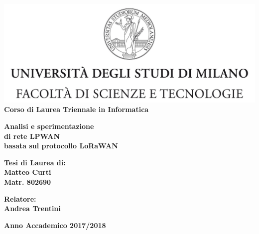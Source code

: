 \documentclass[a4paper]{report} %
\begin{document}
\hypersetup{pageanchor=false}
\begin{titlepage}
\begin{center}
\includegraphics[width=\textwidth]{Logo.jpg}\\
{\large{\bf Corso di Laurea Triennale in Informatica}}
\end{center}
\vspace{12mm}
\begin{center}
{\huge{\bf Analisi e sperimentazione}} \\ %
\vspace{4mm}
{\huge{\bf di rete LPWAN}} \\ %
\vspace{4mm}
{\huge{\bf basata sul protocollo LoRaWAN}} \\ %
\end{center}
\vspace{12mm}
\begin{flushright}
{\large{\bf Tesi di Laurea di:}}\\
{\large{\bf Matteo Curti}}\\
{\large{\bf Matr. 802690}}\\
\end{flushright}
\vspace{4mm}
\begin{flushleft}
{\large{\bf Relatore:}}\\
{\large{\bf Andrea Trentini}}\\
\vspace{4mm}
\end{flushleft}
\vspace{12mm}
\begin{center}
{\large{\bf Anno Accademico 2017/2018}}
\end{center}
\end{titlepage}
\tableofcontents
\listoffigures
\listoftables
\end{document}
